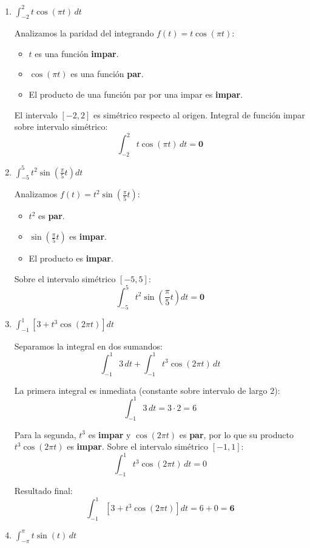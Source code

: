 \documentclass[10pt,a4paper]{article}
\begin{document}
	\begin{enumerate}[label=\textbf{\alph*)}]
		\item $\displaystyle\int_{-2}^{2} t\cos(\pi t)\,dt$
		
		Analizamos la paridad del integrando $f(t) = t\cos(\pi t)$:
		\begin{itemize}
		    \item $t$ es una función \textbf{impar}.
		    \item $\cos(\pi t)$ es una función \textbf{par}.
		    \item El producto de una función par por una impar es \textbf{impar}.
		\end{itemize}
		El intervalo $[-2, 2]$ es simétrico respecto al origen. Integral de función impar sobre intervalo simétrico:
		\[
		\int_{-2}^{2} t\cos(\pi t)\,dt = \mathbf{0}
		\]
		
		\item $\displaystyle\int_{-5}^{5} t^2\sin\!\left(\frac{\pi}{5}t\right)dt$
		
		Analizamos $f(t) = t^2\sin\!\left(\frac{\pi}{5}t\right)$:
		\begin{itemize}
		    \item $t^2$ es \textbf{par}.
		    \item $\sin\!\left(\frac{\pi}{5}t\right)$ es \textbf{impar}.
		    \item El producto es \textbf{impar}.
		\end{itemize}
		Sobre el intervalo simétrico $[-5, 5]$:
		\[
		\int_{-5}^{5} t^2\sin\!\left(\frac{\pi}{5}t\right)dt = \mathbf{0}
		\]
		
		\item $\displaystyle\int_{-1}^{1}\left[3 + t^3\cos(2\pi t)\right]dt$
		
		Separamos la integral en dos sumandos:
		\[
		\int_{-1}^{1} 3\,dt + \int_{-1}^{1} t^3\cos(2\pi t)\,dt
		\]
		
		La primera integral es inmediata (constante sobre intervalo de largo $2$):
		\[
		\int_{-1}^{1} 3\,dt = 3\cdot 2 = 6
		\]
		
		Para la segunda, $t^3$ es \textbf{impar} y $\cos(2\pi t)$ es \textbf{par}, por lo que su producto $t^3\cos(2\pi t)$ es \textbf{impar}. Sobre el intervalo simétrico $[-1,1]$:
		\[
		\int_{-1}^{1} t^3\cos(2\pi t)\,dt = 0
		\]
		
		Resultado final:
		\[
		\int_{-1}^{1}\left[3 + t^3\cos(2\pi t)\right]dt = 6 + 0 = \mathbf{6}
		\]
		
		\item $\displaystyle\int_{-\pi}^{\pi} t\sin(t)\,dt$
		

\end{enumerate}
\end{document}
